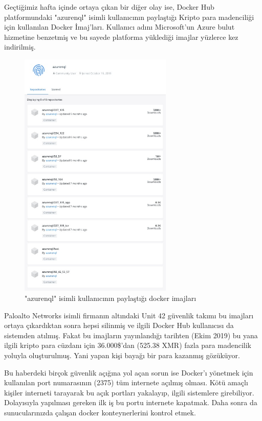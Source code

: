 \documentclass[11pt]{article}
\begin{document}
Geçtiğimiz hafta içinde ortaya çıkan bir diğer olay ise, Docker Hub
platformundaki "azurenql" isimli kullanıcının paylaştığı Kripto para
madenciliği için kullanılan Docker İmaj'ları. Kullanıcı adını Microsoft'un
Azure bulut hizmetine benzetmiş ve bu sayede platforma yüklediği imajlar
yüzlerce kez indirilmiş.

\begin{figure}[htbp]
\centering
\includegraphics[height=12cm]{gorseller/docker-hub-azurenql.jpg}
\caption{"azurenql" isimli kullanıcının paylaştığı docker imajları}
\end{figure}

Paloalto Networks isimli firmanın altındaki Unit 42 güvenlik takımı bu
imajları ortaya çıkardıktan sonra hepsi silinmiş ve ilgili Docker Hub
kullanıcısı da sistemden atılmış. Fakat bu imajların yayınlandığı tarihten
(Ekim 2019) bu yana ilgili kripto para cüzdanı için 36.000\$'dan (525.38 XMR)
fazla para madencilik yoluyla oluşturulmuş. Yani yapan kişi bayağı bir para
kazanmış gözüküyor.

Bu haberdeki birçok güvenlik açığına yol açan sorun ise Docker'ı yönetmek için
kullanılan port numarasının (2375) tüm internete açılmış olması. Kötü amaçlı
kişiler interneti tarayarak bu açık portları yakalayıp, ilgili sistemlere
girebiliyor. Dolayısıyla yapılması gereken ilk iş bu portu internete kapatmak.
Daha sonra da sunucularınızda çalışan docker konteynerlerini kontrol etmek.
\end{document}
